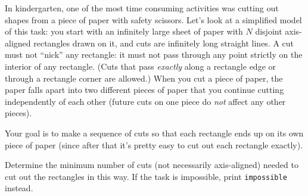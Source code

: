 




In kindergarten, one of the most time consuming activities was cutting out shapes from a piece of paper with safety scissors.
Let's look at a simplified model of this task: you start with an infinitely large sheet of paper with $N$ disjoint
axis-aligned rectangles drawn on it, and cuts are infinitely long straight lines.
A cut must not ``nick'' any rectangle: it must not pass through any point strictly on the interior of any rectangle. (Cuts that pass \emph{exactly} along a rectangle edge or through a rectangle corner are allowed.)
When you cut a piece of paper, the paper falls apart into two different pieces of paper that you continue cutting independently of each other (future cuts on one piece do \emph{not} affect any other pieces).

Your goal is to make a sequence of cuts so that each rectangle ends up on its own piece of paper (since after that it's pretty easy to cut out each rectangle exactly).

Determine the minimum number of cuts (not necessarily axis-aligned) needed to cut out the rectangles in this way. If the task is impossible, print \texttt{impossible} instead.

